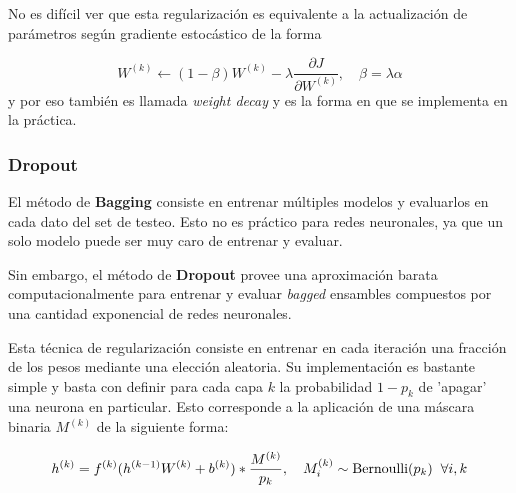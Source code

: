 No es difícil ver que esta regularización es equivalente a la actualización de parámetros según gradiente estocástico de la forma 

\begin{equation*}
W^{(k)} \gets (1-\beta) W^{(k)} - \lambda \frac{\partial J}{\partial W^{(k)}}, \quad \beta = \lambda \alpha
\end{equation*}
y por eso también es llamada \textit{weight decay} y es la forma en que se implementa en la práctica. 

\subsubsection{Dropout}

El método de \textbf{Bagging} consiste en entrenar m\'ultiples modelos y evaluarlos en cada dato del set de testeo. Esto no es pr\'actico para redes neuronales, ya que un solo modelo puede ser muy caro de entrenar y evaluar. 

Sin embargo, el método de \textbf{Dropout} provee una aproximaci\'on barata computacionalmente para entrenar y evaluar \textit{bagged} ensambles compuestos por una cantidad exponencial de redes neuronales.

Esta técnica de regularización consiste en entrenar en cada iteración una fracción de los pesos mediante una elección aleatoria. Su implementación es bastante simple y basta con definir para cada capa $k$ la probabilidad $1-p_k$ de 'apagar' una neurona en particular. Esto corresponde a la aplicación de una máscara binaria $M^{(k)}$ de la siguiente forma:

\begin{equation}
h^{(k)} = f^{(k)}(h^{(k-1)}W^{(k)} + b^{(k)}) *  \frac{M^{(k)}}{p_k}, \quad M^{(k)}_i \sim \text{Bernoulli}(p_k) \hspace{0.2cm} \forall i,k
\end{equation}

